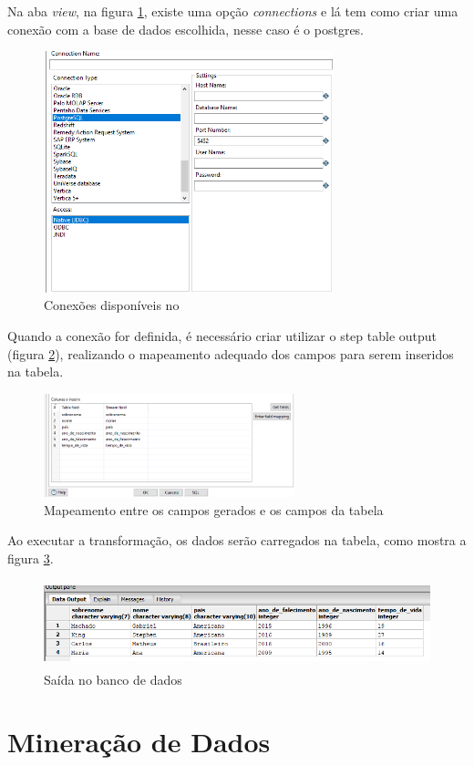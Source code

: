 Na aba \textit{view}, na figura \ref{database}, existe uma opção \textit{connections} e lá tem como criar uma conexão com a base de dados escolhida, nesse caso é o postgres.\\
\begin{figure}[H]
\centering
\includegraphics[height=7cm]{imagens/conexao.png}
\caption{Conexões disponíveis no \pdi}
\label{database}
\end{figure}
Quando a conexão for definida, é necessário criar utilizar o step table output (figura \ref{outputtable}), realizando o mapeamento adequado dos campos para serem inseridos na tabela.
\begin{figure}[H]
\centering
\includegraphics[height=3cm]{imagens/tablemapping.png}
\caption{Mapeamento entre os campos gerados e os campos da tabela}
\label{outputtable}
\end{figure}
Ao executar a transformação, os dados serão carregados na tabela, como mostra a figura \ref{table}.
\begin{figure}[H]
\centering
\includegraphics[height=2.5cm]{imagens/saidasql.png}
\caption{Saída no banco de dados}
\label{table}
\end{figure}

\section{Mineração de Dados}

